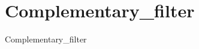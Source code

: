 \chapter{Complementary\+\_\+filter }
\hypertarget{md__r_e_a_d_m_e}{}\label{md__r_e_a_d_m_e}
\label{md__r_e_a_d_m_e_autotoc_md0}%
%


Complementary\+\_\+filter 